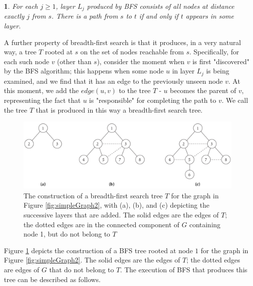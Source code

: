 \documentclass[12pt,a4paper]{book}
\newtheorem{lemma}{}[chapter]
\begin{document}
\begin{lemma}
For each $j \geq 1$, layer $L_{j}$ produced by BFS consists of all nodes at distance exactly $j$ from $s$. There is a path from $s$ to $t$ if and only if $t$ appears in some layer.
\end{lemma}
A further property of breadth-first search is that it produces, in a very natural way, a tree $T$ rooted at $s$ on the set of nodes reachable from $s$. Specifically, for each such node $v$ (other than $s$), consider the moment when $v$ is first "discovered" by the BFS algorithm; this happens when some node $u$ in layer $L_{j}$ is being examined, and we find that it has an edge to the previously unseen node $v$. At this moment, we add the $edge (u,v)$ to the tree $T$ - $u$ becomes the parent of $v$, representing the fact that $u$ is "responsible" for completing the path to $v$. We call the tree $T$ that is produced in this way a breadth-first search tree.\par
\begin{figure}[h]
    \centering
    \label{fig:simpleGraph3}
    \includegraphics[width=\textwidth]{simpleGraph3}
    \caption{ The construction of a breadth-first search tree $T$ for the graph in Figure \ref{fig:simpleGraph2}, with (a), (b), and (c) depicting the successive layers that are added. The solid edges are the edges of $T$; the dotted edges are in the connected component of $G$ containing node 1, but do not belong to $T$}
\end{figure}
Figure \ref{fig:simpleGraph3} depicts the construction of a BFS tree rooted at node $1$ for the graph in Figure \ref{fig:simpleGraph2}. The solid edges are the edges of $T$; the dotted edges are edges of $G$ that do not belong to $T$. The execution of BFS that produces this tree can be described as follows.
\end{document}
